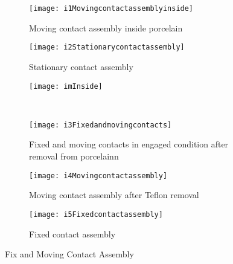 \begin{figure}
    \centering
    \begin{subfigure}[b]{0.3\textwidth}
        \centering
        \texttt{[image: i1Movingcontactassemblyinside]}
        \caption{Moving contact assembly inside porcelain}
        \label{fig:Moving contact assembly inside porcelain}
    \end{subfigure}
    \begin{subfigure}[b]{0.3\textwidth}
        \centering
        \texttt{[image: i2Stationarycontactassembly]}
        \caption{Stationary contact assembly}
        \label{fig:Stationary contact assembly}
    \end{subfigure}
    \begin{subfigure}[b]{0.3\textwidth}
        \centering
        \texttt{[image: imInside]}
        \vspace{0.9cm}
    \end{subfigure}
    \\
    \begin{subfigure}[b]{0.3\textwidth}
        \centering
        \texttt{[image: i3Fixedandmovingcontacts]}
        \caption{Fixed and moving contacts in engaged condition after removal from porcelainn}
        \label{fig:Fixed and moving contacts in engaged condition after removal from porcelain}
    \end{subfigure}
    \begin{subfigure}[b]{0.3\textwidth}
        \centering
        \texttt{[image: i4Movingcontactassembly]}
        \caption{Moving contact assembly after Teflon removal}
        \label{fig:Moving contact assembly after Teflon removal}
        \vspace{0.7cm}
    \end{subfigure}
    \begin{subfigure}[b]{0.3\textwidth}
        \centering
        \texttt{[image: i5Fixedcontactassembly]}
        \caption{Fixed contact assembly}
        \label{fig:Fixed contact assembly}
        \vspace{1.4cm}
    \end{subfigure}
    \caption{Fix and Moving Contact Assembly}
    \label{fig:Fix and Moving Contact Assembly}
\end{figure}

